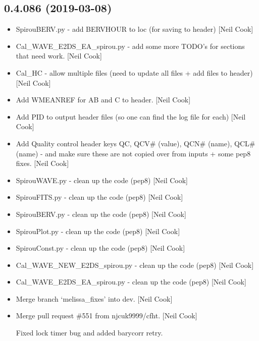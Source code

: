 \documentclass[a4paper,10pt,english]{report}
\begin{document}
\subsection{0.4.086 (2019-03-08)}
\label{\detokenize{misc/changelog:id173}}\begin{itemize}
\item {} 
SpirouBERV.py - add BERVHOUR to loc (for saving to header) {[}Neil Cook{]}

\item {} 
Cal\_WAVE\_E2DS\_EA\_spirou.py - add some more TODO’s for sections that
need work. {[}Neil Cook{]}

\item {} 
Cal\_HC - allow multiple files (need to update all files + add files to
header) {[}Neil Cook{]}

\item {} 
Add WMEANREF for AB and C to header. {[}Neil Cook{]}

\item {} 
Add PID to output header files (so one can find the log file for each)
{[}Neil Cook{]}

\item {} 
Add Quality control header keys QC, QCV\# (value), QCN\# (name), QCL\#
(name) - and make sure these are not copied over from inputs + some
pep8 fixes. {[}Neil Cook{]}

\item {} 
SpirouWAVE.py - clean up the code (pep8) {[}Neil Cook{]}

\item {} 
SpirouFITS.py - clean up the code (pep8) {[}Neil Cook{]}

\item {} 
SpirouBERV.py - clean up the code (pep8) {[}Neil Cook{]}

\item {} 
SpirouPlot.py - clean up the code (pep8) {[}Neil Cook{]}

\item {} 
SpirouConst.py - clean up the code (pep8) {[}Neil Cook{]}

\item {} 
Cal\_WAVE\_NEW\_E2DS\_spirou.py - clean up the code (pep8) {[}Neil Cook{]}

\item {} 
Cal\_WAVE\_E2DS\_EA\_spirou.py - clean up the code (pep8) {[}Neil Cook{]}

\item {} 
Merge branch ‘melissa\_fixes’ into dev. {[}Neil Cook{]}

\item {} 
Merge pull request \#551 from njcuk9999/cfht. {[}Neil Cook{]}

Fixed lock timer bug and added barycorr retry.

\end{itemize}
\end{document}
